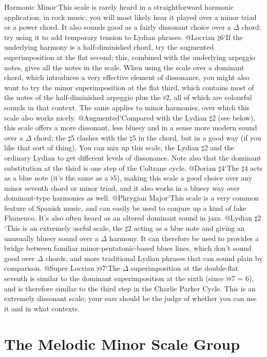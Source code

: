 \documentclass[english]{./gbook}
\begin{document}
\begin{large}
Harmonic Minor`This scale is rarely heard in a straightforward harmonic application; in rock music, you will most likely hear it played over a minor triad or a power chord. It also sounds good as a fairly dissonant choice over a $\Delta$ chord; try using it to add temporary tension to Lydian phrases.
@Locrian $\natural 6$`If the underlying harmony is a half-diminished chord, try the augmented superimposition at the flat second; this, combined with the underlying arpeggio notes, gives all the notes in the scale. When using the scale over a dominant chord, which introduces a very effective element of dissonance, you might also want to try the minor superimposition at the flat third, which contains most of the notes of the half-diminished arpeggio plus the $\flat$2, all of which are colourful sounds in that context. The same applies to minor harmonies, over which this scale also works nicely.
@Augmented`Compared with the Lydian $\sharp$2 (see below), this scale offers a more dissonant, less bluesy and in a sense more modern sound over a $\Delta$ chord; the $\sharp$5 clashes with the $\natural$5 in the chord, but in a good way (if you like that sort of thing). You can mix up this scale, the Lydian $\sharp$2 and the ordinary Lydian to get different levels of dissonance. Note also that the dominant substitution at the third is one step of the Coltrane cycle.
@Dorian $\sharp 4$`The $\sharp 4$ acts as a blue note (it's the same as a $\flat 5$), making this scale a good choice over any minor seventh chord or minor triad, and it also works in a bluesy way over dominant-type harmonies as well.
@Phrygian Major`This scale is a very common feature of Spanish music, and can easily be used to conjure up a kind of fake Flamenco. It's also often heard as an altered dominant sound in jazz.
@Lydian $\sharp 2$`This is an extremely useful scale, the $\sharp 2$ acting as a blue note and giving an unusually bluesy sound over a $\Delta$ harmony. It can therefore be used to provides a bridge between familiar minor-pentatonic-based blues lines, which don't sound good over $\Delta$ chords, and more traditional Lydian phrases that can sound plain by comparison.
@Super Locrian $\flat\flat$7`The $\Delta$ superimposition at the double-flat seventh is similar to the dominant superimposition at the sixth (since $\flat\flat$7 = 6), and is therefore similar to the third step in the Charlie Parker Cycle. This is an extremely dissonant scale; your ears should be the judge of whether you can use it and in what contexts. 
%

\section{The Melodic Minor Scale Group}


\end{large}
\end{document}
